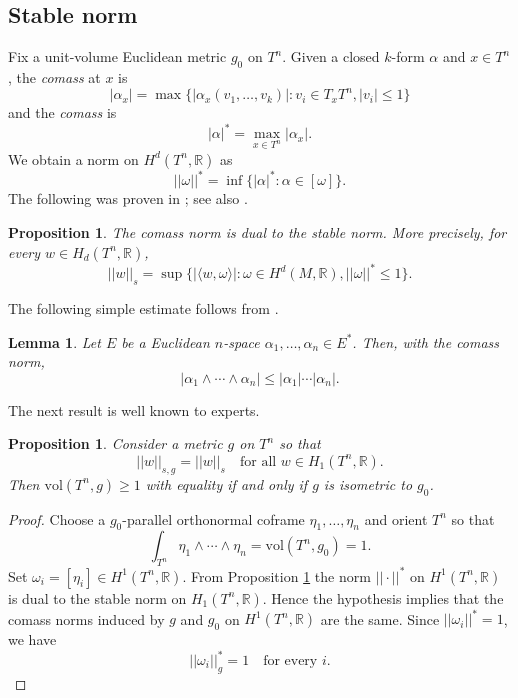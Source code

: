 \documentclass[11pt]{amsart}
\def\R{\mathbb R}
\def\vol{\mathrm{vol}}
\newtheorem{lemm}[thm]{Lemma}
\newtheorem{prop}[thm]{Proposition}
\theoremstyle{remark}
\theoremstyle{definition}
\begin{document}
	\subsection{Stable norm}\label{stable.norm.appendix}
	{Fix a unit-volume Euclidean metric $g_0$ on $T^n$. Given a closed $k$-form $\alpha$ and $x\in T^n$, the {\em comass} at $x$ is $$|\alpha_x|=\max\{|\alpha_x(v_1,\ldots,v_k)|:v_i\in T_xT^n, |v_i|\leq 1\}$$ and the {\em comass}  is
		$$|\alpha|^*=\max_{x\in T^n}|\alpha_x|.$$
		We obtain a norm on $H^d(T^n,\R)$ as
		$$||\omega||^*=\inf\{|\alpha|^*:\alpha\in [\omega]\}.$$
		The following was proven in \cite[4.10]{Federer74}; see also \cite[4.35]{Gro99}.
		\begin{prop}\label{comass.dual} The comass norm is dual to the stable norm. More precisely, for every $w\in H_d(T^n,\R)$,
			$$||w||_s=\sup\{|\langle w,\omega\rangle|: \omega\in H^d(M,\R), ||\omega||^* \leq 1 \}.$$
		\end{prop}
		The following simple estimate follows from \cite[Proposition 4.3]{HK26}.
		\begin{lemm}\label{forms} Let $E$ be a Euclidean $n$-space
			$\alpha_1,\ldots,\alpha_n\in E^*$. Then, with the comass norm,
			$$|\alpha_1\wedge\cdots\wedge\alpha_n|\leq |\alpha_1|\cdots |\alpha_n|.$$
		\end{lemm}
		
		The next result is well known to experts.
		\begin{prop} Consider a metric $g$  on $T^n$ so that 
			$$||w||_{s,g}=||w||_{s}\quad\text{for all }w\in H_1(T^n,\R).$$
			Then $\vol(T^n,g)\geq 1$ with equality if and only if $g$ is isometric to $g_0$.
		\end{prop}
		\begin{proof}
			Choose a $g_0$-parallel orthonormal coframe $\eta_1,\ldots,\eta_n$ and orient
			$T^n$ so that
			$$\int_{T^n}\eta_1\wedge\cdots\wedge\eta_n=\vol(T^n,g_0)=1.$$
			Set $\omega_i=[\eta_i]\in H^1(T^n,\R)$. From Proposition \ref{comass.dual}  the norm
			$||\cdot||^*$ on $H^1(T^n,\R)$ is dual to the stable norm on
			$H_1(T^n,\R)$. Hence the hypothesis implies that the comass norms induced by
			$g$ and $g_0$ on $H^1(T^n,\R)$ are the same. Since
			$||\omega_i||^*=1$, we have
			$$||\omega_i||^*_{g}=1\quad\text{for every }i.$$
			

\end{proof}}
\end{document}
